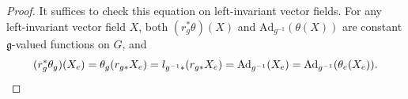 \begin{proof}
    It suffices to check this equation on left-invariant vector fields. For any left-invariant vector field $X$, 
    both $(r_g^*\theta)(X)$ and $\mathrm{Ad}_{g^{-1}}(\theta(X))$ are constant $\mathfrak{g}$-valued functions on $G$, and
    \begin{equation*}
        (r_g^*\theta_g)(X_e) = \theta_{g}(r_{g*}X_e) = l_{g^{-1}*}(r_{g*}X_e) 
        = \mathrm{Ad}_{g^{-1}}(X_e) = \mathrm{Ad}_{g^{-1}}(\theta_e(X_e)). \qedhere
    \end{equation*}
\end{proof}